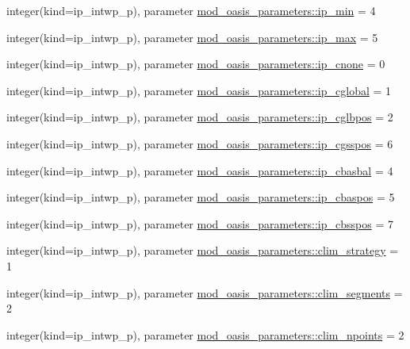 \begin{DoxyCompactItemize}
\item 
integer(kind=ip\+\_\+intwp\+\_\+p), parameter \hyperlink{namespacemod__oasis__parameters_a194cfc3b7f2d515492e04fd6e8931c60}{mod\+\_\+oasis\+\_\+parameters\+::ip\+\_\+min} = 4
\item 
integer(kind=ip\+\_\+intwp\+\_\+p), parameter \hyperlink{namespacemod__oasis__parameters_abe7b7d586b50bd7c7d77c7834efa2801}{mod\+\_\+oasis\+\_\+parameters\+::ip\+\_\+max} = 5
\item 
integer(kind=ip\+\_\+intwp\+\_\+p), parameter \hyperlink{namespacemod__oasis__parameters_ae043e4e2c2b7f04fec7d8c061ef52934}{mod\+\_\+oasis\+\_\+parameters\+::ip\+\_\+cnone} = 0
\item 
integer(kind=ip\+\_\+intwp\+\_\+p), parameter \hyperlink{namespacemod__oasis__parameters_ae251e3ac1c9c82ae5db2a768d2d59d5f}{mod\+\_\+oasis\+\_\+parameters\+::ip\+\_\+cglobal} = 1
\item 
integer(kind=ip\+\_\+intwp\+\_\+p), parameter \hyperlink{namespacemod__oasis__parameters_aec700ad0c6a11dd35e5d6c2afb745fd0}{mod\+\_\+oasis\+\_\+parameters\+::ip\+\_\+cglbpos} = 2
\item 
integer(kind=ip\+\_\+intwp\+\_\+p), parameter \hyperlink{namespacemod__oasis__parameters_a49f38ac3b4cada9ce9b7f5aa8b57f4a0}{mod\+\_\+oasis\+\_\+parameters\+::ip\+\_\+cgsspos} = 6
\item 
integer(kind=ip\+\_\+intwp\+\_\+p), parameter \hyperlink{namespacemod__oasis__parameters_aaa7ead98ff7d53acfd539a32fca9e2c7}{mod\+\_\+oasis\+\_\+parameters\+::ip\+\_\+cbasbal} = 4
\item 
integer(kind=ip\+\_\+intwp\+\_\+p), parameter \hyperlink{namespacemod__oasis__parameters_a3b96d31bbe142d84df2b93880498936f}{mod\+\_\+oasis\+\_\+parameters\+::ip\+\_\+cbaspos} = 5
\item 
integer(kind=ip\+\_\+intwp\+\_\+p), parameter \hyperlink{namespacemod__oasis__parameters_a2199bfd0d49116fed576cec76f63372b}{mod\+\_\+oasis\+\_\+parameters\+::ip\+\_\+cbsspos} = 7
\item 
integer(kind=ip\+\_\+intwp\+\_\+p), parameter \hyperlink{namespacemod__oasis__parameters_a611cae6f3c65a75f26e76b2f88f34037}{mod\+\_\+oasis\+\_\+parameters\+::clim\+\_\+strategy} = 1
\item 
integer(kind=ip\+\_\+intwp\+\_\+p), parameter \hyperlink{namespacemod__oasis__parameters_a7427036a6530871a0f49c0fb75f2b3ef}{mod\+\_\+oasis\+\_\+parameters\+::clim\+\_\+segments} = 2
\item 
integer(kind=ip\+\_\+intwp\+\_\+p), parameter \hyperlink{namespacemod__oasis__parameters_a6c376f3049b7af988e71a2e50a1c50ba}{mod\+\_\+oasis\+\_\+parameters\+::clim\+\_\+npoints} = 2

\end{DoxyCompactItemize}
